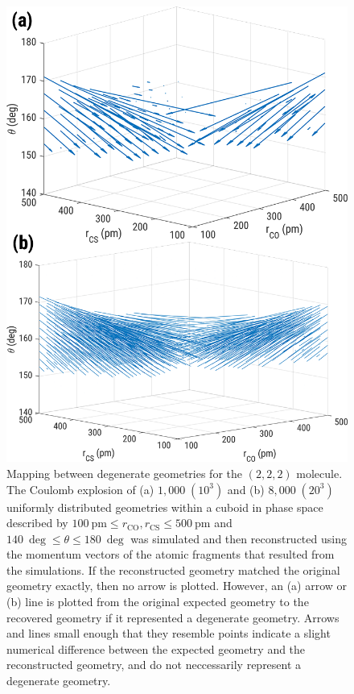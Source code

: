 \begin{figure}
  \centering
  \includegraphics[width=\textwidth]{Plots/OCS222DegeneracyMap}
  \caption[Mapping between degenerate geometries for the  $(2,2,2)$ molecule.]
  {Mapping between degenerate geometries for the  $(2,2,2)$ molecule. The Coulomb explosion of (a) $1,000 \; (10^3)$ and (b) $8,000 \; (20^3)$ uniformly distributed geometries within a cuboid in phase space described by $\SI{100}{\pico\meter} \le r_\mathrm{CO}, r_\mathrm{CS} \le \SI{500}{\pico\meter}$ and $\SI{140}{\deg} \le \theta \le \SI{180}{\deg}$ was simulated and then reconstructed using the momentum vectors of the atomic fragments that resulted from the simulations. If the reconstructed geometry matched the original geometry exactly, then no arrow is plotted. However, an (a) arrow or (b) line is plotted from the original expected geometry to the recovered geometry if it represented a degenerate geometry. Arrows and lines small enough that they resemble points indicate a slight numerical difference between the expected geometry and the reconstructed geometry, and do not neccessarily represent a degenerate geometry.}
  \label{fig:OCS222DegeneracyMapSD}
\end{figure}


